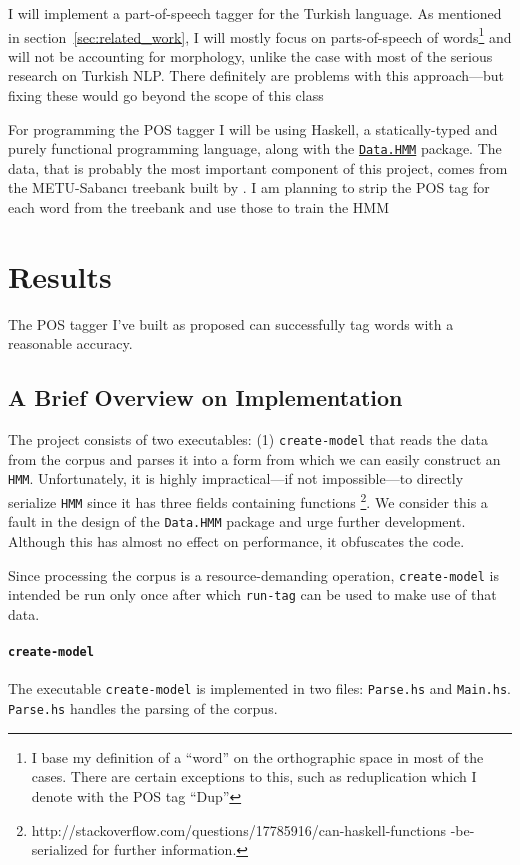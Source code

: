 \documentclass{article}
\newcommand{\hmmURL}{https://hackage.haskell.org/package/hmm-0.2.1.1/docs/Data-HMM.html}
\begin{document}
I will implement a part-of-speech tagger for the Turkish language. As
mentioned in section~\ref{sec:related_work}, I will mostly focus on parts-of-speech
of words\footnote{I base my definition of a ``word'' on the orthographic space in
  most of the cases. There are certain exceptions to this, such as
  reduplication which I denote with the POS tag ``Dup''} and will not be
accounting for morphology, unlike
the case with most of the serious research on Turkish NLP. There definitely are
problems with this approach---but fixing these would go beyond the scope of
this class

For programming the POS tagger I will be using Haskell, a statically-typed and purely
functional programming language, along with the
\href{\hmmURL}{\texttt{Data.HMM}} package.
The data, that is probably the most important component of this
project, comes from the METU-Sabanc{\i} treebank built by
\citet{oflazer2003building}.  I am planning to strip the POS tag for each word from
the treebank and use those to train the HMM

\section{Results}
The POS tagger I've built as proposed can successfully tag words with a
reasonable accuracy.

\subsection{A Brief Overview on Implementation}
The project consists of two executables: (1) \texttt{create-model} that reads
the data from the corpus and parses it into a form from which we can easily
construct an \texttt{HMM}. Unfortunately, it is highly impractical---if not
impossible---to directly serialize \texttt{HMM} since it has three fields
containing functions
\footnote{http://stackoverflow.com/questions/17785916/can-haskell-functions
  -be-serialized for further information.}. We consider this a fault in the
design of the \texttt{Data.HMM} package and urge further development. Although
this has almost no effect on performance, it obfuscates the code.

Since processing the corpus is a resource-demanding operation,
\texttt{create-model} is intended be run only once after which \texttt{run-tag}
can be used to make use of that data.

\paragraph{\texttt{create-model}}
The executable \texttt{create-model} is implemented in two files:
\texttt{Parse.hs} and \texttt{Main.hs}. \texttt{Parse.hs} handles the parsing of
the corpus.
\end{document}
